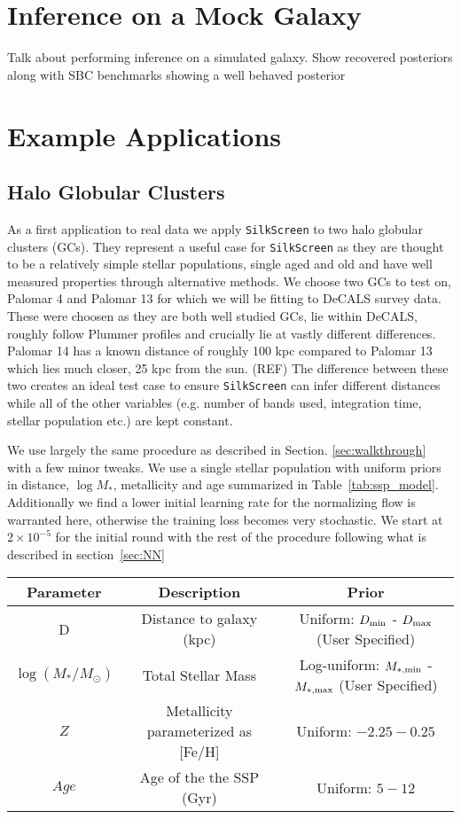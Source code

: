 \documentclass[twocolumn]{aastex631}
\newcommand{\code}[0]{\texttt{SilkScreen}}
\begin{document}
\section{Inference on a Mock Galaxy}
\label{self-test}
Talk about performing inference on a simulated galaxy. Show recovered posteriors along with SBC benchmarks showing a well behaved posterior

\section{Example Applications}
\subsection{Halo Globular Clusters}
\label{sec:gc}
As a first application to real data we apply \code{} to two halo globular clusters (GCs). They represent a useful case for \code{} as they are thought to be a relatively simple stellar populations, single aged and old and have well measured properties through alternative methods. We choose two GCs to test on, Palomar 4 and Palomar 13 for which we will be fitting to DeCALS survey data. These were choosen as they are both well studied GCs, lie within DeCALS, roughly follow Plummer profiles and crucially lie at vastly different differences. Palomar 14 has a known distance of roughly 100 kpc compared to Palomar 13 which lies much closer, 25 kpc from the sun. (REF) The difference between these two creates an ideal test case to ensure \code{} can infer different distances while all of the other variables (e.g. number of bands used, integration time, stellar population etc.) are kept constant.

We use largely the same procedure as described in Section. \ref{sec:walkthrough} with a few minor tweaks. We use a single stellar population with uniform priors in distance, $\log M_*$, metallicity and age summarized in Table~\ref{tab:ssp_model}. Additionally we find a lower initial learning rate for the normalizing flow is warranted here, otherwise the training loss becomes very stochastic. We start at $2\times 10^{-5}$ for the initial round with the rest of the procedure following what is described in section~\ref{sec:NN}

\begin{table*}
    \centering
    \caption{The parameters are priors for our SSP model parameterized used to model globular clusters}
    \small
    \begin{tabular}{c c c} 
        Parameter & Description & Prior \\  \hline \hline
         D & Distance to galaxy (kpc) & Uniform: $D_{\rm min}$ -  $D_{\rm max}$ (User Specified) \\
         $\log (M_*/M_\odot)$ & Total Stellar Mass & Log-uniform: $M_{\rm*, min}$ -  $M_{\rm* , max}$ (User Specified) \\
         $Z$ & Metallicity parameterized as [Fe/H] & Uniform: $-2.25-0.25$ \\
         $Age$& Age of the the SSP (Gyr) & Uniform: $5-12$\\ \hline
    \end{tabular}
    \label{tab:ssp_model}
\end{table*}
\end{document}
